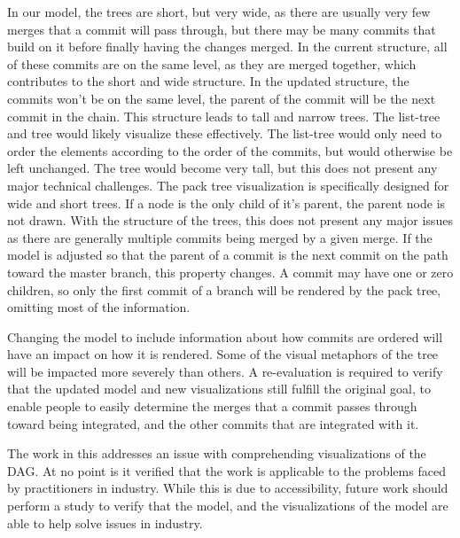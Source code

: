 In our model, the trees are short, but very wide, as there are usually
very few merges that a commit will pass through, but there may be many
commits that build on it before finally having the changes merged.
In the current structure, all of these commits are on the same level, as
they are merged together, which contributes to the short and wide
structure.
In the updated structure, the commits won't be on the same level, the
parent of the commit will be the next commit in the chain.
This structure leads to tall and narrow trees.
The list-tree and \rt{} tree would likely visualize these effectively.
The list-tree would only need to order the elements according to the
order of the commits, but would otherwise be left unchanged.
The \rt{} tree would become very tall, but this does not present any
major technical challenges.
The pack tree visualization is specifically designed for wide and short
trees.
If a node is the only child of it's parent, the parent node is not
drawn.
With the structure of the trees, this does not present any major issues
as there are generally multiple commits being merged by a given merge.
If the model is adjusted so that the parent of a commit is the next
commit on the path toward the master branch, this property changes.
A commit may have one or zero children, so only the first commit of a
branch will be rendered by the pack tree, omitting most of the
information.


Changing the model to include information about how commits are ordered
will have an impact on how it is rendered.
Some of the visual metaphors of the tree will be impacted more severely
than others.
A re-evaluation is required to verify that the updated model and new
visualizations still fulfill the original goal, to enable people to
easily determine the merges that a commit passes through toward being
integrated, and the other commits that are integrated with it.

The work in this \paper{} addresses an issue with comprehending
visualizations of the DAG\@.
At no point is it verified that the work is applicable to the problems
faced by practitioners in industry.
While this is due to accessibility,
future work should perform a study to verify that the \mt{} model,
and the visualizations of the model are able to help solve issues in industry.
